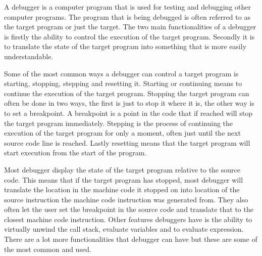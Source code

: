  


A debugger is a computer program that is used for testing and debugging other computer programs.
The program that is being debugged is often referred to as the target program or just the target.
The two main functionalities of a debugger is firstly the ability to control the execution of the target program.
Secondly it is to translate the state of the target program into something that is more easily understandable.


Some of the most common ways a debugger can control a target program is starting, stopping, stepping and resetting it.
Starting or continuing means to continue the execution of the target program.
Stopping the target program can often be done in two ways, the first is just to stop it where it is, the other way is to set a breakpoint.
A breakpoint is a point in the code that if reached will stop the target program immediately.
Stepping is the process of continuing the execution of the target program for only a moment, often just until the next source code line is reached.
Lastly resetting means that the target program will start execution from the start of the program.


Most debugger display the state of the target program relative to the source code.
This means that if the target program has stopped, most debugger will translate the location in the machine code it stopped on into location of the source instruction the machine code instruction was generated from.
They also often let the user set the breakpoint in the source code and translate that to the closest machine code instruction.
Other features debuggers have is the ability to virtually unwind the call stack, evaluate variables and to evaluate expression.
There are a lot more functionalities that debugger can have but these are some of the most common and used.

